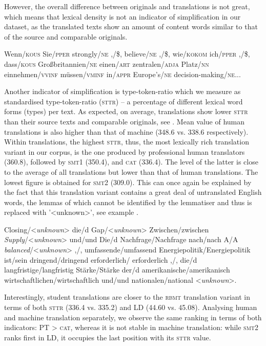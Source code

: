\documentclass[output=paper]{LSP/langsci}
\begin{document}
However, the overall difference between originals and translations is not great, which means that lexical density is not an indicator of simplification in our dataset, as the translated texts show an amount of content words similar to that of the source and comparable originals.

\ea \label{ex:4:1}
Wenn/\textsc{kous} Sie/\textsc{pper} strongly/\textsc{ne} ,/\$, believe/\textsc{ne} ,/\$, wie/\textsc{kokom} ich/\textsc{pper} ,/\$, dass/\textsc{kous} Großbritannien/\textsc{ne} einen/\textsc{art} zentralen/\textsc{adja} Platz/\textsc{nn} einnehmen/\textsc{vvinf} müssen/\textsc{vminf} in/\textsc{appr} Europe’s/\textsc{ne} decision-making/\textsc{ne}...
\z

Another indicator of simplification is type-token-ratio which we measure as standardised type-token-ratio (\textsc{sttr}) – a percentage of different lexical word forms (types) per text.  As expected, on average, translations show lower \textsc{sttr} than their source texts and comparable originals, see . Mean value of human translations is also higher than that of machine (348.6 vs. 338.6 respectively). Within translations, the highest \textsc{sttr}, thus, the most lexically rich translation variant in our corpus, is the one produced by professional human translators (360.8), followed by \textsc{smt}1 (350.4), and \textsc{cat} (336.4).  The level of the latter is close to the average of all translations but lower than that of human translations. The lowest figure is obtained for \textsc{smt}2 (309.0). This can once again be explained by the fact that this translation variant contains a great deal of untranslated English words, the lemmas of which cannot be identified by the lemmatiser and thus is replaced with '<unknown>’, see example .

\ea \label{ex:4:2}
Closing/<\textit{unknown}> die/d Gap/<\textit{unknown}> Zwischen/zwischen \textit{Supply}/<\textit{unknown}> und/und Die/d Nachfrage/Nachfrage nach/nach A/A \textit{balanced}/<\textit{unknown}> ,/, umfassende/umfassend Energiepolitik/Energiepolitik ist/sein dringend/dringend erforderlich/  erforderlich ,/, die/d langfristige/langfristig Stärke/Stärke der/d  amerikanische/amerikanisch wirtschaftlichen/wirtschaftlich und/und nationalen/national <\textit{unknown}>.
\z

Interestingly, student translations are closer to the \textsc{rbmt} translation variant in terms of both \textsc{sttr} (336.4 vs. 335.2) and LD (44.60 vs. 45.08). Analysing human and machine translation separately, we observe the same ranking in terms of both indicators: PT > \textsc{cat}, whereas it is not stable in machine translation: while \textsc{smt}2 ranks first in LD, it occupies the last position with its \textsc{sttr} value.
\end{document}
